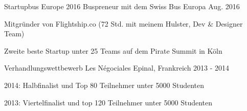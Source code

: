 

\begin{cventries}

  \cventry
    {Startupbus Europe 2016} %
    {Buspreneur mit dem Swiss Bus} %
    {Europa} %
    {Aug. 2016} %
    {
      \begin{cvitems} %
        \item {Mitgründer von Flightship.co (72 Std. mit meinem Hulster, Dev \& Designer Team)}
        \item {Zweite beste Startup unter 25 Teams auf dem Pirate Summit in Köln}
      \end{cvitems}
    }

  \cventry
    {Verhandlungswettbewerb} %
    {Les Négociales} %
    {Epinal, Frankreich} %
    {2013 - 2014} %
    {
    	\begin{cvitems}
    	\item{2014: Halbfinalist und Top 80 Teilnehmer unter 5000 Studenten}
    	\item{2013: Viertelfinalist und top 120 Teilnehmer unter 5000 Studenten}
    	\end{cvitems}
    }
\end{cventries}

